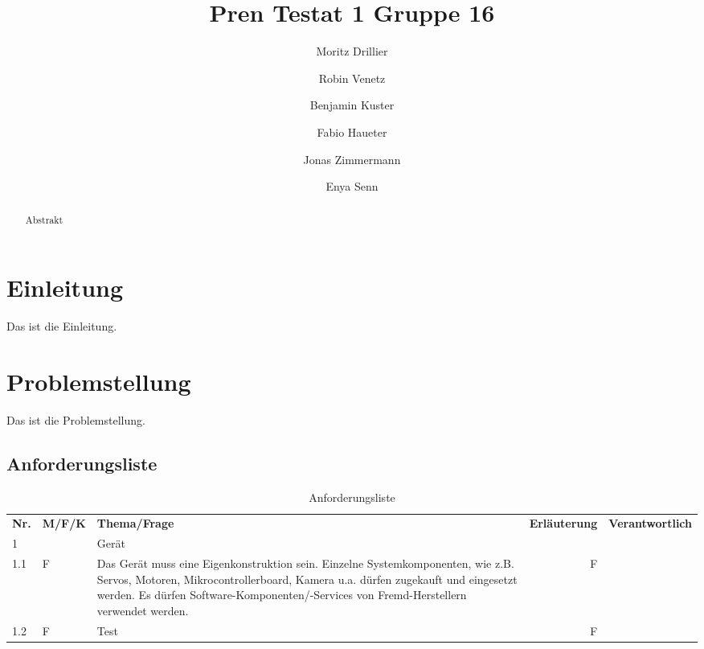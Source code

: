 \documentclass{article}
\title{Pren Testat 1 Gruppe 16}
\author{Moritz Drillier \and Robin Venetz \and Benjamin Kuster \and Fabio Haueter \and Jonas Zimmermann \and Enya Senn}
\date{\thedate}
\begin{document}
\maketitle

\tableofcontents 

\begin{abstract}
Abstrakt
\end{abstract}

\section{Einleitung}
Das ist die Einleitung.
\section{Problemstellung}
Das ist die Problemstellung.



\begin{landscape} %
    \section{Anforderungsliste}
    \begin{table}[H] %
        \centering
        \begin{tabular}{llp{17cm}rr}
            \textbf{Nr.} & \textbf{M/F/K} & \textbf{Thema/Frage} & \textbf{Erläuterung} & \textbf{Verantwortlich} \\
            1 &  & Gerät & &   \\
            1.1 & F & Das Gerät muss eine Eigenkonstruktion sein. Einzelne Systemkomponenten, wie z.B. Servos,
            Motoren, Mikrocontrollerboard, Kamera u.a. dürfen zugekauft und eingesetzt werden. Es
            dürfen Software-Komponenten/-Services von Fremd-Herstellern verwendet werden. & F &   \\
            1.2 & F & Test & F &   \\
        \end{tabular}
        \caption{Anforderungsliste}
        \label{tab:my_label}
    \end{table}
\end{landscape} %
\end{document}
